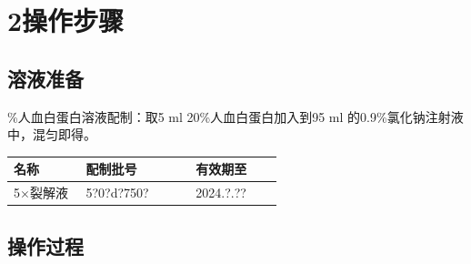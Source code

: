 \documentclass[UTF8,10pt,a4paper,fontset=fandol]{ctexart}
\newcommand{\fieldvalue}[1]{#1}
\newcommand{\handwritten}[1]{#1}
\begin{document}
\section*{2\quad 操作步骤}

\subsection*{溶液准备}

\%人血白蛋白溶液配制：取5 ml 20\%人血白蛋白加入到95 ml
的0.9\%氯化钠注射液中，混匀即得。

\begin{tabular}{|p{0.25\linewidth}|p{0.38\linewidth}|p{0.30\linewidth}|}
\hline
名称 & 配制批号 & 有效期至 \\ \hline
5$\times$裂解液 &
\fieldvalue{\handwritten{5?0?d?750?}} &
\fieldvalue{\handwritten{2024.?.??}}
\\ \hline
\end{tabular}

\subsection*{操作过程}
\end{document}

